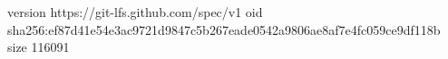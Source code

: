 version https://git-lfs.github.com/spec/v1
oid sha256:ef87d41e54e3ac9721d9847c5b267eade0542a9806ae8af7e4fc059ce9df118b
size 116091
